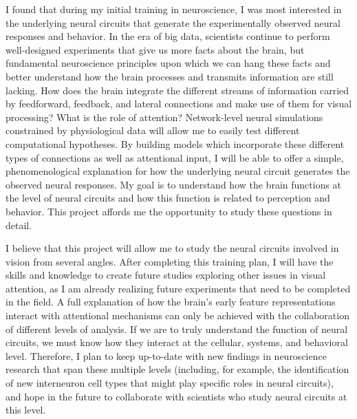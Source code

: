 \documentclass[11pt,notitlepage]{article}
\begin{document}
I found that during my initial training in neuroscience, I was most interested in the underlying neural circuits that generate the experimentally observed neural responses and behavior. In the era of big data, scientists continue to perform well-designed experiments that give us more facts about the brain, but fundamental neuroscience principles upon which we can hang these facts and better understand how the brain processes and transmits information are still lacking. How does the brain integrate the different streams of information carried by
feedforward, feedback, and lateral connections and make use of them for visual processing?
What is the role of attention? Network-level neural simulations constrained by physiological data will allow me to easily test different computational hypotheses. By building models which incorporate these different types of connections as well as attentional input,
I will be able to offer a simple, phenomenological explanation for how the underlying neural circuit generates the observed neural responses. My goal is to understand how the brain functions at the level of neural circuits and how this function is related to perception and behavior. This project affords me the opportunity to study these questions in detail.

I believe that this project will allow me to study the neural circuits involved in vision from several angles. After completing this training plan, I will have the skills and knowledge to create future studies exploring other issues in visual attention, as I am already realizing future experiments that need to be completed in the field. A full explanation of how the brain's early feature representations interact with attentional mechanisms can only be achieved with the collaboration of different levels of analysis. If we are to truly understand the function of neural circuits, we must know how they interact at the cellular, systems, and behavioral level. Therefore, I plan to keep up-to-date with new findings in neuroscience research that span these multiple levels (including, for example, the identification of new interneuron cell types that might play specific roles in neural circuits), and hope in the future to collaborate with scientists who study neural circuits at this level.
\end{document}
